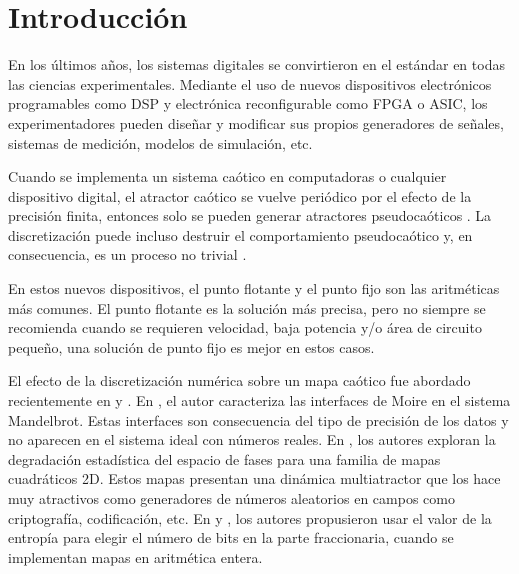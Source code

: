 \section{Introducción}

En los últimos años, los sistemas digitales se convirtieron en el estándar en todas las ciencias experimentales.
Mediante el uso de nuevos dispositivos electrónicos programables como DSP y electrónica reconfigurable como FPGA o ASIC, los experimentadores pueden diseñar y modificar sus propios generadores de señales, sistemas de medición, modelos de simulación, etc.

Cuando se implementa un sistema caótico en computadoras o cualquier dispositivo digital, el atractor caótico se vuelve periódico por el efecto de la precisión finita, entonces solo se pueden generar atractores pseudocaóticos \cite{Alcover2017, Dias2011}.
La discretización puede incluso destruir el comportamiento pseudocaótico y, en consecuencia, es un proceso no trivial \cite{Azzaz2013, Hoover2017, DeMicco2017}.

En estos nuevos dispositivos, el punto flotante y el punto fijo son las aritméticas más comunes.
El punto flotante es la solución más precisa, pero no siempre se recomienda cuando se requieren velocidad, baja potencia y/o área de circuito pequeño, una solución de punto fijo es mejor en estos casos.

El efecto de la discretización numérica sobre un mapa caótico fue abordado recientemente en \cite{Alcover2017} y \cite{DeMicco2017}.
En \cite{Alcover2017}, el autor caracteriza las interfaces de Moire en el sistema Mandelbrot.
Estas interfaces son consecuencia del tipo de precisión de los datos y no aparecen en el sistema ideal con números reales.
En \cite{DeMicco2017}, los autores exploran la degradación estadística del espacio de fases para una familia de mapas cuadráticos 2D.
Estos mapas presentan una dinámica multiatractor que los hace muy atractivos como generadores de números aleatorios en campos como criptografía, codificación, etc. En \cite{Tlelo-Cuautle2016} y \cite{DelaFraga2017}, los autores propusieron usar el valor de la entropía para elegir el número de bits en la parte fraccionaria, cuando se implementan mapas en aritmética entera.

